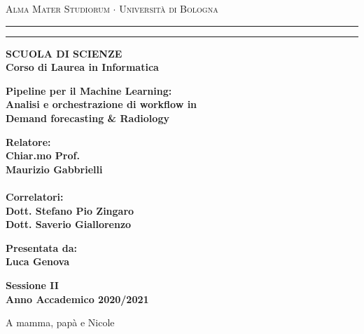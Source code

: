 \documentclass[12pt,a4paper]{report}
\newenvironment{dedication}
{%
\thispagestyle{empty}%
\vspace*{\stretch{1}}%
\itshape             %
\raggedleft          %
}
{\par %
\vspace{\stretch{3}} %
\clearpage           %
}
\begin{document}
\begin{titlepage}
\begin{center}
{{\Large{\textsc{Alma Mater Studiorum $\cdot$ Universit\`a di
Bologna}}}} \rule[0.1cm]{15.8cm}{0.1mm}
\rule[0.5cm]{15.8cm}{0.6mm}
{\small{\bf SCUOLA DI SCIENZE\\
Corso di Laurea in Informatica }}
\end{center}
\vspace{15mm}

\begin{center}
{\LARGE{\bf Pipeline per il Machine Learning:}}\\
\vspace{3mm}
{\LARGE{\bf Analisi e orchestrazione di workflow in}}\\
\vspace{3mm}
{\LARGE{\bf Demand forecasting \& Radiology}}\\
\end{center}
\vspace{40mm}
\par
\noindent
\begin{minipage}[t]{0.47\textwidth}
{\large{\bf Relatore:\\
Chiar.mo Prof.\\
Maurizio Gabbrielli\\
\\
Correlatori:\\
Dott. Stefano Pio Zingaro\\
Dott. Saverio Giallorenzo\\
}}
\end{minipage}
\hfill
\begin{minipage}[t]{0.47\textwidth}\raggedleft
{\large{\bf Presentata da:\\
Luca Genova}}
\end{minipage}
\vspace{20mm}
\begin{center}
{\large{\bf Sessione II\\%
Anno Accademico 2020/2021}}%
\end{center}
\end{titlepage}

\begin{dedication}
    A mamma, papà e Nicole
\end{dedication}

\tableofcontents
\end{document}
